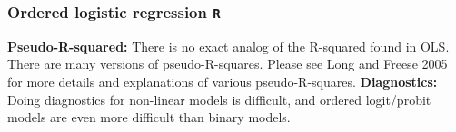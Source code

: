 \documentclass[00-GLMregslides.tex]{subfiles}
\begin{document}
\begin{frame}[fragile]
	\frametitle{Ordered logistic regression \texttt{R} }
	\Large
\textbf{Pseudo-R-squared: }There is no exact analog of the R-squared found in OLS. There are many versions of pseudo-R-squares. Please see Long and Freese 2005 for more details and explanations of various pseudo-R-squares.
\textbf{Diagnostics:} Doing diagnostics for non-linear models is difficult, and ordered logit/probit models are even more difficult than binary models.
\end{frame}


\end{document}
